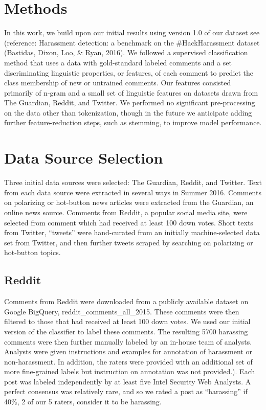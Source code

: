 \documentclass[11pt,a4paper]{article}
\begin{document}
\section{Methods}

In this work, we build upon our initial results using
version 1.0 of our dataset see (reference: Harassment
detection: a benchmark on the \#HackHarassment
dataset (Bastidas, Dixon, Loo, \& Ryan,
2016). We followed a supervised classification
method that uses a data with gold-standard labeled
comments and a set discriminating linguistic properties,
or features, of each comment to predict the
class membership of new or untrained comments.
Our features consisted primarily of n-gram
and a small set of linguistic features on datasets
drawn from The Guardian, Reddit, and Twitter. We
performed no significant pre-processing on the
data other than tokenization, though in the future
we anticipate adding further feature-reduction
steps, such as stemming, to improve model performance.

\section{Data Source Selection}

Three initial data sources were selected: The
Guardian, Reddit, and Twitter. Text from each data
source were extracted in several ways in Summer
2016. Comments on polarizing or hot-button news
articles were extracted from the Guardian, an
online news source. Comments from Reddit, a
popular social media site, were selected from comment
which had received at least 100 down votes.
Short texts from Twitter, “tweets” were hand-curated
from an initially machine-selected data set
from Twitter, and then further tweets scraped by
searching on polarizing or hot-button topics.

\subsection{Reddit}
Comments from Reddit were downloaded from a
publicly available dataset on Google BigQuery,
reddit\_comments\_all\_2015. These comments
were then filtered to those that had received at least
100 down votes. We used our initial version of the
classifier to label these comments. The resulting
5700 harassing comments were then further manually
labeled by an in-house team of analysts. Analysts
were given instructions and examples for
annotation of harassment or non-harassment. In
addition, the raters were provided with an additional
set of more fine-grained labels but instruction
on annotation was not provided.). Each post
was labeled independently by at least five Intel Security
Web Analysts. A perfect consensus was relatively
rare, and so we rated a post as “harassing”
if 40\%, 2 of our 5 raters, consider it to be harassing.
\end{document}
